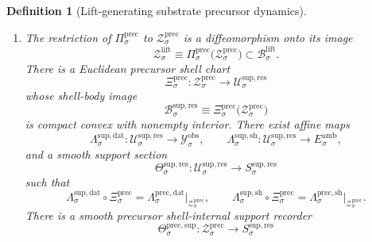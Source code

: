 \documentclass[11pt]{article}
\newcommand{\DataSpace}[1]{\mathcal Y_{#1}^{\mathrm{obs}}}
\newcommand{\AmbientTarget}[1]{E_{#1}^{\mathrm{amb}}}
\newcommand{\EqnTarget}[1]{Q_{#1}^{\mathrm{eqn}}}
\newcommand{\EqnPair}[1]{\mathfrak b_{#1}^{\mathrm{eqn}}}
\newcommand{\ResSpace}[1]{\mathcal U_{#1}^{\mathrm{sup,res}}}
\newcommand{\ResBody}[1]{\mathcal B_{#1}^{\mathrm{sup,res}}}
\newcommand{\ResTarget}[1]{S_{#1}^{\mathrm{sup,res}}}
\newcommand{\ResPair}[1]{\mathfrak m_{#1}^{\mathrm{sup,res}}}
\newcommand{\ResSection}[1]{\Theta_{#1}^{\mathrm{sup,res}}}
\newcommand{\ResData}[1]{\Lambda_{#1}^{\mathrm{sup,dat}}}
\newcommand{\ResShellMap}[1]{\Lambda_{#1}^{\mathrm{sup,sh}}}
\newcommand{\SubSpace}[1]{\mathcal M_{#1}^{\mathrm{sub}}}
\newcommand{\LiftSpace}[1]{\mathcal L_{#1}^{\mathrm{lift}}}
\newcommand{\LiftBody}[1]{\mathcal B_{#1}^{\mathrm{lift}}}
\newcommand{\LiftProj}[1]{\Pi_{#1}^{\mathrm{lift}}}
\newcommand{\LiftData}[1]{\Lambda_{#1}^{\mathrm{lift,dat}}}
\newcommand{\LiftShellMap}[1]{\Lambda_{#1}^{\mathrm{lift,sh}}}
\newcommand{\LiftShellSet}[1]{\mathcal Z_{#1}^{\mathrm{lift}}}
\newcommand{\PrecSpace}[1]{\mathcal P_{#1}^{\mathrm{prec}}}
\newcommand{\PrecBody}[1]{\mathcal B_{#1}^{\mathrm{prec}}}
\newcommand{\PrecProj}[1]{\Pi_{#1}^{\mathrm{prec}}}
\newcommand{\PrecLiftMin}[1]{\mathfrak f_{#1}^{\mathrm{prec}}}
\newcommand{\PrecSubMin}[1]{\mathfrak m_{#1}^{\mathrm{prec}}}
\newcommand{\PrecSection}[1]{\Gamma_{#1}^{\mathrm{prec}}}
\newcommand{\PrecData}[1]{\Lambda_{#1}^{\mathrm{prec,dat}}}
\newcommand{\PrecShellMap}[1]{\Lambda_{#1}^{\mathrm{prec,sh}}}
\newcommand{\PrecSym}[1]{\mathbb G_{#1}^{\mathrm{prec}}}
\newcommand{\PrecTime}[1]{\vartheta_{#1}^{\mathrm{prec}}}
\newcommand{\PrecShellSet}[1]{\mathcal Z_{#1}^{\mathrm{prec}}}
\newcommand{\PrecChart}[1]{\Xi_{#1}^{\mathrm{prec}}}
\newcommand{\PrecSupport}[1]{\Theta_{#1}^{\mathrm{prec,sup}}}
\newtheorem{definition}{Definition}
\begin{document}
\begin{definition}[Lift-generating substrate precursor dynamics]
\begin{enumerate}
\begin{equation}
    \end{equation}
    There is also a finite-dimensional Euclidean support target
    \[
    \ResTarget{\sigma},
    \]
    a positive-definite symmetric support pairing
    \[
    \ResPair{\sigma}:
    \ResTarget{\sigma}\times\ResTarget{\sigma}\to\mathbb R,
    \]
    a finite-dimensional real hidden target
    \[
    \EqnTarget{\sigma},
    \]
    and a positive-definite symmetric hidden pairing
    \[
    \EqnPair{\sigma}:
    \EqnTarget{\sigma}\times\EqnTarget{\sigma}\to\mathbb R.
    \]
    There is a compact symmetry group
    \[
    \PrecSym{\sigma}
    \]
    and an involution
    \[
    \PrecTime{\sigma},
    \]
    acting orthogonally on \(\PrecSpace{\sigma}\), \(\LiftSpace{\sigma}\), \(\SubSpace{\sigma}\), \(\DataSpace{\sigma}\), \(\AmbientTarget{\sigma}\), and \(\ResTarget{\sigma}\), and by \(\EqnPair{\sigma}\)-isometries on \(\EqnTarget{\sigma}\), preserving \(\PrecBody{\sigma}\), \(\LiftBody{\sigma}\), \(\PrecProj{\sigma}\), \(\LiftProj{\sigma}\), \(\PrecLiftMin{\sigma}\), \(\PrecSubMin{\sigma}\), \(\PrecSection{\sigma}\), \(\LiftData{\sigma}\), \(\LiftShellMap{\sigma}\), \(\PrecData{\sigma}\), and \(\PrecShellMap{\sigma}\).
    \item The restriction of \(\PrecProj{\sigma}\) to \(\PrecShellSet{\sigma}\) is a diffeomorphism onto its image
    \[
    \LiftShellSet{\sigma}
    \equiv
    \PrecProj{\sigma}\bigl(\PrecShellSet{\sigma}\bigr)
    \subset\LiftBody{\sigma}.
    \]
    There is a Euclidean precursor shell chart
    \[
    \PrecChart{\sigma}:\PrecShellSet{\sigma}\to\ResSpace{\sigma}
    \]
    whose shell-body image
    \[
    \ResBody{\sigma}
    \equiv
    \PrecChart{\sigma}\bigl(\PrecShellSet{\sigma}\bigr)
    \]
    is compact convex with nonempty interior. There exist affine maps
    \[
    \ResData{\sigma}:\ResSpace{\sigma}\to\DataSpace{\sigma},
    \qquad
    \ResShellMap{\sigma}:\ResSpace{\sigma}\to\AmbientTarget{\sigma},
    \]
    and a smooth support section
    \[
    \ResSection{\sigma}:\ResSpace{\sigma}\to\ResTarget{\sigma}
    \]
    such that
    \begin{equation}
    \ResData{\sigma}\circ\PrecChart{\sigma}
    =
    \PrecData{\sigma}\big|_{\PrecShellSet{\sigma}},
    \qquad
    \ResShellMap{\sigma}\circ\PrecChart{\sigma}
    =
    \PrecShellMap{\sigma}\big|_{\PrecShellSet{\sigma}}.
    \label{eq:precchartreadouts}
    \end{equation}
    There is a smooth precursor shell-internal support recorder
    \[
    \PrecSupport{\sigma}:\PrecShellSet{\sigma}\to\ResTarget{\sigma}
\]
\end{enumerate}
\end{definition}
\end{document}
